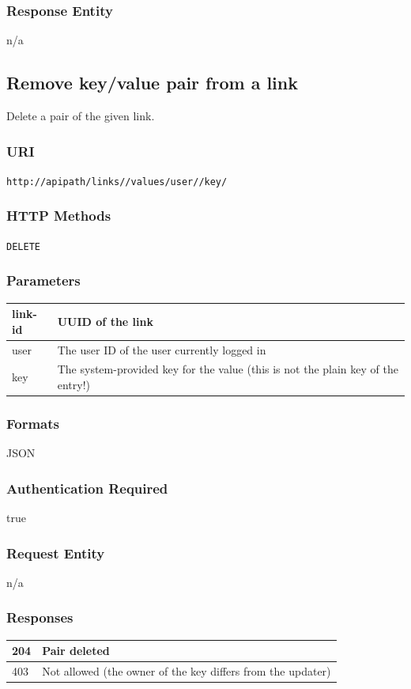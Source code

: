 \documentclass[10pt]{article}
\begin{document}
\subsubsection{Response Entity}
n/a
\subsection{Remove key/value pair from a link}
Delete a pair of the given link.
\subsubsection{URI}
\texttt{http://apipath/links//values/user//key/
}\subsubsection{HTTP Methods}
\texttt{DELETE}
\subsubsection{Parameters}
\begin{tabular}{|l|l|}\hline
link-id & UUID of the link \\
\hline
user & The user ID of the user currently logged in \\
\hline
key & The system-provided key for the value (this is not the plain key of the entry!) \\
\hline
\end{tabular}
\subsubsection{Formats}
JSON
\subsubsection{Authentication Required}
true
\subsubsection{Request Entity}
n/a
\subsubsection{Responses}
\begin{tabular}{|l|l|}\hline
204 & Pair deleted \\
\hline
403 & Not allowed (the owner of the key differs from the updater) \\
\hline
\end{tabular}
\end{document}
